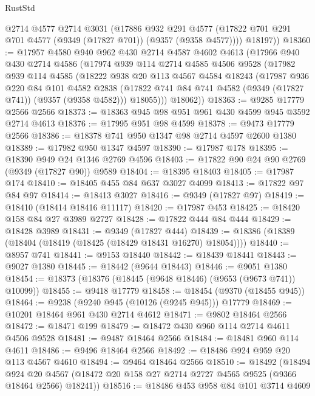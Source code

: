 \begin{lexlean}{RustStd}
\begin{coremodule}
        @2714
        @4577
        @2714
        @3031
        (@17886
          @932
          @291
          @4577
          (@17822 @701 @291 @701 @4577 (@9349 (@17827 @701)) (@9357 (@9358 @4577))))
        @18197))
@18360 := @17957
    @4580
    @940
    @962
    @430
    @2714
    @4587
    @4602
    @4613
    (@17966
      @940
      @430
      @2714
      @4586
      (@17974
        @939
        @114
        @2714
        @4585
        @4506
        @9528
        (@17982
          @939
          @114
          @4585
          (@18222
            @938
            @20
            @113
            @4567
            @4584
            @18243
            (@17987
              @936
              @220
              @84
              @101
              @4582
              @2838
              (@17822 @741 @84 @741 @4582 (@9349 (@17827 @741)) (@9357 (@9358 @4582)))
              @18055)))
        @18062))
@18363 := @9285 @17779 @2566 @2566
@18373 := @18363 @945 @98 @951 @961 @430 @4599 @945 @3592 @2714 @4613
@18376 := @17995 @951 @98 @4599
@18378 := @9473 @17779 @2566
@18386 := @18378 @741 @950 @1347 @98 @2714 @4597 @2600 @1380
@18389 := @17982 @950 @1347 @4597
@18390 := @17987 @178
@18395 := @18390 @949 @24 @1346 @2769 @4596
@18403 := @17822 @90 @24 @90 @2769 (@9349 (@17827 @90)) @9589
@18404 := @18395 @18403
@18405 := @17987 @174
@18410 := @18405 @455 @84 @637 @3027 @4099
@18413 := @17822 @97 @84 @97
@18414 := @18413 @3027
@18416 := @9349 (@17827 @97)
@18419 := @18410 (@18414 @18416 @11117)
@18420 := @17987 @453
@18425 := @18420 @158 @84 @27 @3989 @2727
@18428 := @17822 @444 @84 @444
@18429 := @18428 @3989
@18431 := @9349 (@17827 @444)
@18439 := @18386 (@18389 (@18404 (@18419 (@18425 (@18429 @18431 @16270) @18054))))
@18440 := @8957 @741
@18441 := @9153 @18440
@18442 := @18439 @18441
@18443 := @9027 @1380
@18445 := @18442 (@9644 @18443)
@18446 := @9051 @1380
@18454 := @18373 (@18376 (@18445 (@9648 @18446) (@9653 (@9673 @741)) @10099))
@18455 := @9418 @17779
@18458 := @18454 (@9370 (@18455 @945))
@18464 := @9238 (@9240 @945 (@10126 (@9245 @945))) @17779
@18469 := @10201 @18464 @961 @430 @2714 @4612
@18471 := @9802 @18464 @2566
@18472 := @18471 @199
@18479 := @18472 @430 @960 @114 @2714 @4611 @4506 @9528
@18481 := @9487 @18464 @2566
@18484 := @18481 @960 @114 @4611
@18486 := @9496 @18464 @2566
@18492 := @18486 @924 @959 @20 @113 @4567 @4610
@18494 := @9464 @18464 @2566
@18510 := @18492
    (@18494
      @924
      @20
      @4567
      (@18472 @20 @158 @27 @2714 @2727 @4565 @9525 (@9366 @18464 @2566) @18241))
@18516 := @18486 @453 @958 @84 @101 @3714 @4609

\end{coremodule}
\end{lexlean}
